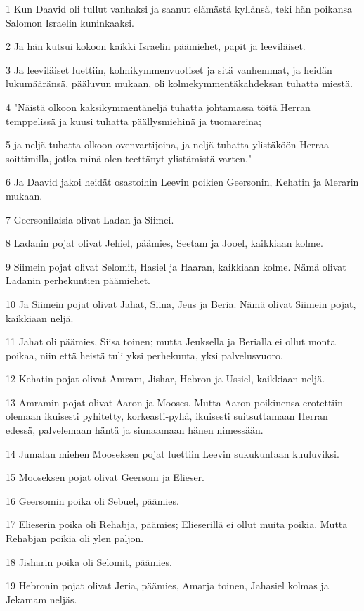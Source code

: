 \par 1 Kun Daavid oli tullut vanhaksi ja saanut elämästä kyllänsä, teki hän poikansa Salomon Israelin kuninkaaksi.
\par 2 Ja hän kutsui kokoon kaikki Israelin päämiehet, papit ja leeviläiset.
\par 3 Ja leeviläiset luettiin, kolmikymmenvuotiset ja sitä vanhemmat, ja heidän lukumääränsä, pääluvun mukaan, oli kolmekymmentäkahdeksan tuhatta miestä.
\par 4 "Näistä olkoon kaksikymmentäneljä tuhatta johtamassa töitä Herran temppelissä ja kuusi tuhatta päällysmiehinä ja tuomareina;
\par 5 ja neljä tuhatta olkoon ovenvartijoina, ja neljä tuhatta ylistäköön Herraa soittimilla, jotka minä olen teettänyt ylistämistä varten."
\par 6 Ja Daavid jakoi heidät osastoihin Leevin poikien Geersonin, Kehatin ja Merarin mukaan.
\par 7 Geersonilaisia olivat Ladan ja Siimei.
\par 8 Ladanin pojat olivat Jehiel, päämies, Seetam ja Jooel, kaikkiaan kolme.
\par 9 Siimein pojat olivat Selomit, Hasiel ja Haaran, kaikkiaan kolme. Nämä olivat Ladanin perhekuntien päämiehet.
\par 10 Ja Siimein pojat olivat Jahat, Siina, Jeus ja Beria. Nämä olivat Siimein pojat, kaikkiaan neljä.
\par 11 Jahat oli päämies, Siisa toinen; mutta Jeuksella ja Berialla ei ollut monta poikaa, niin että heistä tuli yksi perhekunta, yksi palvelusvuoro.
\par 12 Kehatin pojat olivat Amram, Jishar, Hebron ja Ussiel, kaikkiaan neljä.
\par 13 Amramin pojat olivat Aaron ja Mooses. Mutta Aaron poikinensa erotettiin olemaan ikuisesti pyhitetty, korkeasti-pyhä, ikuisesti suitsuttamaan Herran edessä, palvelemaan häntä ja siunaamaan hänen nimessään.
\par 14 Jumalan miehen Mooseksen pojat luettiin Leevin sukukuntaan kuuluviksi.
\par 15 Mooseksen pojat olivat Geersom ja Elieser.
\par 16 Geersomin poika oli Sebuel, päämies.
\par 17 Elieserin poika oli Rehabja, päämies; Elieserillä ei ollut muita poikia. Mutta Rehabjan poikia oli ylen paljon.
\par 18 Jisharin poika oli Selomit, päämies.
\par 19 Hebronin pojat olivat Jeria, päämies, Amarja toinen, Jahasiel kolmas ja Jekamam neljäs.
